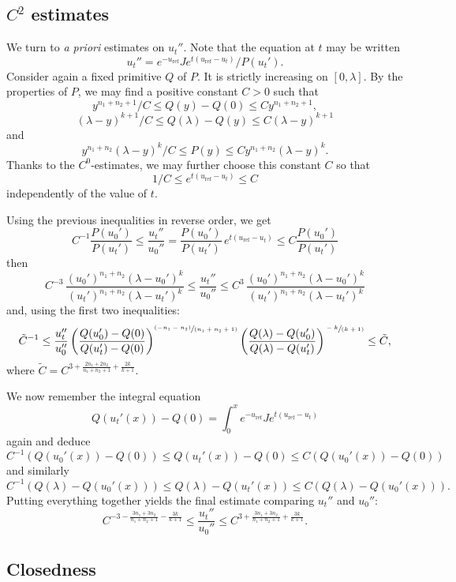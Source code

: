 \documentclass[JEP,XML,SOM,Unicode, NoEqCountersInSection, NoFloatCountersInSection]{cedram}
\newcommand{\spfrac}[2]{\sfrac{#1}{(#2)}}
\newcommand{\pspfrac}[2]{\sfrac{(#1)}{(#2)}}
\theoremstyle{plain}
\theoremstyle{definition}
\begin{document}
\subsection{$C^2$ estimates}

We turn to \emph{a priori} estimates on $u_t''$.
Note that the equation at $t$ may be written
\[ u_t''=e^{-u_{\mathrm{ref}}}Je^{t(u_{\mathrm{ref}}-u_t)}/P(u_t'). \]
Consider again a fixed primitive $Q$ of $P$. It is strictly increasing
on $[0,\lambda]$. By the properties of $P$, we may find a positive constant
$C>0$ such that
\[ y^{n_1+n_2+1}/C \leq Q(y)-Q(0) \leq Cy^{n_1+n_2+1}, \]
\[ (\lambda-y)^{k+1}/C \leq Q(\lambda)-Q(y) \leq C(\lambda-y)^{k+1} \]
and
\[ y^{n_1+n_2}(\lambda-y)^k/C \leq P(y) \leq Cy^{n_1+n_2}(\lambda-y)^k. \]
Thanks to the $C^0$-estimates, we may further choose this constant $C$ so that
\[ 1/C \leq e^{t(u_{\mathrm{ref}}-u_t)} \leq C \]
independently of the value of $t$.

Using the previous inequalities in reverse order, we get
\[ C^{-1}\frac{P(u_0')}{P(u_t')}
	\leq \frac{u_t''}{u_0''}=\frac{P(u_0')}{P(u_t')}\,e^{t(u_{\mathrm{ref}}-u_t)}
	\leq C\frac{P(u_0')}{P(u_t')} \]
then
\[ C^{-3}\,\frac{(u_0')^{n_1+n_2}(\lambda-u_0')^k}{(u_t')^{n_1+n_2}(\lambda-u_t')^k}
	\leq \frac{u_t''}{u_0''} \leq
	C^3\,\frac{(u_0')^{n_1+n_2}(\lambda-u_0')^k}{(u_t')^{n_1+n_2}(\lambda-u_t')^k} \]
and, using the first two inequalities:
\[ \tilde{C}^{-1}
\leq \frac{u_t''}{u_0''} \left(\frac{Q(u_0')-Q(0)}{Q(u_t')-Q(0)}\right)^{\pspfrac{-n_1-n_2}{n_1+n_2+1}}
\left(\frac{Q(\lambda)-Q(u_0')}{Q(\lambda)-Q(u_t')}\right)^{\spfrac{-k}{k+1}} \leq
\tilde{C}, \]
where $\tilde{C}=C^{3+\frac{2n_1+2n_2}{n_1+n_2+1}+\frac{2k}{k+1}}$.

We now remember the integral equation
$$Q(u_t'(x))-Q(0) = \int_0^xe^{-u_{\mathrm{ref}}}Je^{t(u_{\mathrm{ref}}-u_t)}$$
again and deduce
\[ C^{-1}(Q(u_0'(x))-Q(0)) 	\leq Q(u_t'(x))-Q(0) \leq C(Q(u_0'(x))-Q(0)) \]
and similarly
\[ C^{-1}(Q(\lambda)-Q(u_0'(x))) 	\leq Q(\lambda)-Q(u_t'(x)) \leq C(Q(\lambda)-Q(u_0'(x))). \]
Putting everything together yields the final estimate comparing $u_t''$ and $u_0''$:
\[ C^{-3-\frac{3n_1+3n_2}{n_1+n_2+1}-\frac{3k}{k+1}}
	\leq \frac{u_t''}{u_0''}
	\leq C^{3+\frac{3n_1+3n_2}{n_1+n_2+1}+\frac{3k}{k+1}}. \]
	
\subsection{Closedness}
\end{document}
